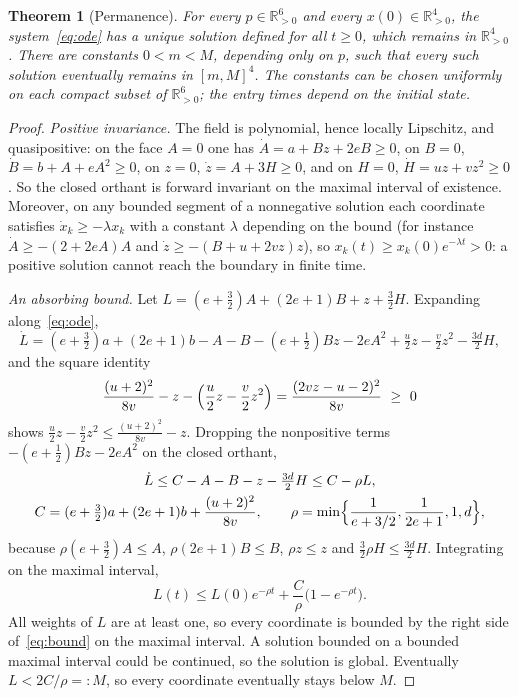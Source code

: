 \documentclass[11pt,a4paper]{article}
\theoremstyle{plain}
\newtheorem{theorem}{Theorem}[section]
\theoremstyle{definition}
\theoremstyle{remark}
\newcommand{\R}{\mathbb{R}}
\newcommand{\Rp}{\R_{>0}}
\begin{document}
\begin{theorem}[Permanence]\label{thm:permanence}
For every $p\in\Rp^6$ and every $x(0)\in\Rp^4$, the system~\eqref{eq:ode} has a unique solution defined for all $t\ge0$, which remains in $\Rp^4$. There are constants $0<m<M$, depending only on $p$, such that every such solution eventually remains in $[m,M]^4$. The constants can be chosen uniformly on each compact subset of $\Rp^6$; the entry times depend on the initial state.
\end{theorem}
\begin{proof}
\emph{Positive invariance.} The field is polynomial, hence locally Lipschitz, and quasipositive: on the face $A=0$ one has $\dot A=a+Bz+2eB\ge0$, on $B=0$, $\dot B=b+A+eA^2\ge0$, on $z=0$, $\dot z=A+3H\ge0$, and on $H=0$, $\dot H=uz+vz^2\ge0$. So the closed orthant is forward invariant on the maximal interval of existence. Moreover, on any bounded segment of a nonnegative solution each coordinate satisfies $\dot x_k\ge-\lambda x_k$ with a constant $\lambda$ depending on the bound (for instance $\dot A\ge-(2+2eA)A$ and $\dot z\ge-(B+u+2vz)z$), so $x_k(t)\ge x_k(0)e^{-\lambda t}>0$: a positive solution cannot reach the boundary in finite time.

\emph{An absorbing bound.} Let $L=(e+\tfrac32)A+(2e+1)B+z+\tfrac32H$. Expanding along~\eqref{eq:ode},
\begin{equation}\label{eq:ldot}
\dot L=(e+\tfrac32)a+(2e+1)b-A-B-(e+\tfrac12)Bz-2eA^2+\tfrac u2z-\tfrac v2z^2-\tfrac{3d}2H ,
\end{equation}
and the square identity
\begin{equation}\label{eq:square}
\frac{(u+2)^2}{8v}-z-\Bigl(\frac u2z-\frac v2z^2\Bigr)=\frac{(2vz-u-2)^2}{8v}\ \ge\ 0
\end{equation}
shows $\tfrac u2z-\tfrac v2z^2\le\tfrac{(u+2)^2}{8v}-z$. Dropping the nonpositive terms $-(e+\frac12)Bz-2eA^2$ on the closed orthant,
\begin{gather*}
\dot L\le C-A-B-z-\tfrac{3d}2H\le C-\rho L,\\
C=(e+\tfrac32)a+(2e+1)b+\frac{(u+2)^2}{8v},\qquad
\rho=\min\Bigl\{\frac1{e+3/2},\frac1{2e+1},1,d\Bigr\},
\end{gather*}
because $\rho(e+\frac32)A\le A$, $\rho(2e+1)B\le B$, $\rho z\le z$ and $\frac32\rho H\le\frac{3d}2H$. Integrating on the maximal interval,
\begin{equation}\label{eq:bound}
L(t)\le L(0)e^{-\rho t}+\frac C\rho\bigl(1-e^{-\rho t}\bigr).
\end{equation}
All weights of $L$ are at least one, so every coordinate is bounded by the right side of~\eqref{eq:bound} on the maximal interval. A solution bounded on a bounded maximal interval could be continued, so the solution is global. Eventually $L<2C/\rho=:M$, so every coordinate eventually stays below $M$.


\end{proof}
\end{document}
